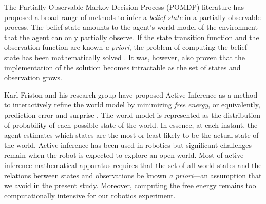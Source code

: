 \documentclass[runningheads]{llncs}
\begin{document}
The Partially Observable Markov Decision Process (POMDP) literature has proposed a broad range of methods to infer a \textit{belief state} in a partially observable process.
The belief state amounts to the agent's world model of the environment that the agent can only partially observe.  
If the state transition function and the observation function are known \textit{a priori}, the problem of computing the belief state has been mathematically solved \cite{astrom1965optimal}. 
It was, however, also proven that the implementation of the solution becomes intractable as the set of states and observation grows. 

Karl Friston and his research group have proposed Active Inference \cite[e.g.]{smith_step-by-step_2022} as a method to interactively refine the world model by minimizing \textit{free energy}, or equivalently, prediction error and surprise \cite{friston_free-energy_2010}.
The world model %
is represented as the distribution of probability %
of each possible state of the world. 
In essence, at each instant, the agent estimates which states are the most or least likely to be the actual state of the world.
Active inference has been used in robotics \cite{lanillos_active_2021} but significant challenges remain when the robot is expected to explore an open world. 
Most of active inference mathematical apparatus requires that the set of all world states and the relations between states and observations be known \textit{a priori}---an assumption that we avoid in the present study. %
Moreover, computing the free energy remains too computationally intensive for our robotics experiment.
\end{document}
